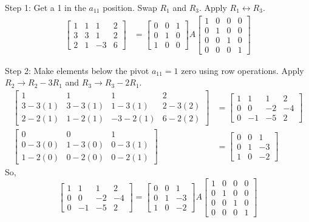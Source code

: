 \documentclass{article}
\begin{document}
Step 1: Get a 1 in the $a_{11}$ position. Swap $R_1$ and $R_3$. Apply $R_1 \leftrightarrow R_3$.
\begin{align*} \begin{bmatrix} 1 & 1 & 1 & 2 \\ 3 & 3 & 1 & 2 \\ 2 & 1 & -3 & 6 \end{bmatrix} &= \begin{bmatrix} 0 & 0 & 1 \\ 0 & 1 & 0 \\ 1 & 0 & 0 \end{bmatrix} A \begin{bmatrix} 1 & 0 & 0 & 0 \\ 0 & 1 & 0 & 0 \\ 0 & 0 & 1 & 0 \\ 0 & 0 & 0 & 1 \end{bmatrix}\end{align*}

Step 2: Make elements below the pivot $a_{11}=1$ zero using row operations.
Apply $R_2 \to R_2 - 3R_1$ and $R_3 \to R_3 - 2R_1$.
\begin{align*} \begin{bmatrix} 1 & 1 & 1 & 2 \\ 3 - 3(1) & 3 - 3(1) & 1 - 3(1) & 2 - 3(2) \\ 2 - 2(1) & 1 - 2(1) & -3 - 2(1) & 6 - 2(2) \end{bmatrix} &= \begin{bmatrix} 1 & 1 & 1 & 2 \\ 0 & 0 & -2 & -4 \\ 0 & -1 & -5 & 2 \end{bmatrix} \\ \begin{bmatrix} 0 & 0 & 1 \\ 0 - 3(0) & 1 - 3(0) & 0 - 3(1) \\ 1 - 2(0) & 0 - 2(0) & 0 - 2(1) \end{bmatrix} &= \begin{bmatrix} 0 & 0 & 1 \\ 0 & 1 & -3 \\ 1 & 0 & -2 \end{bmatrix}\end{align*}
So,
\[ \begin{bmatrix} 1 & 1 & 1 & 2 \\ 0 & 0 & -2 & -4 \\ 0 & -1 & -5 & 2 \end{bmatrix} = \begin{bmatrix} 0 & 0 & 1 \\ 0 & 1 & -3 \\ 1 & 0 & -2 \end{bmatrix} A \begin{bmatrix} 1 & 0 & 0 & 0 \\ 0 & 1 & 0 & 0 \\ 0 & 0 & 1 & 0 \\ 0 & 0 & 0 & 1 \end{bmatrix} \]
\end{document}
